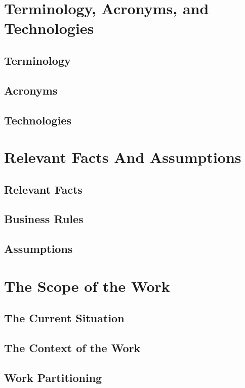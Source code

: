 \documentclass[12pt]{article}
\begin{document}
\section{Terminology, Acronyms, and Technologies}

  \subsection{Terminology}
  \subsection{Acronyms}
  \subsection{Technologies}

\section{Relevant Facts And Assumptions}
  \subsection{Relevant Facts}
  \subsection{Business Rules}
  \subsection{Assumptions}

\section{The Scope of the Work}
  \subsection{The Current Situation}
  \subsection{The Context of the Work}
  \subsection{Work Partitioning}
\end{document}
